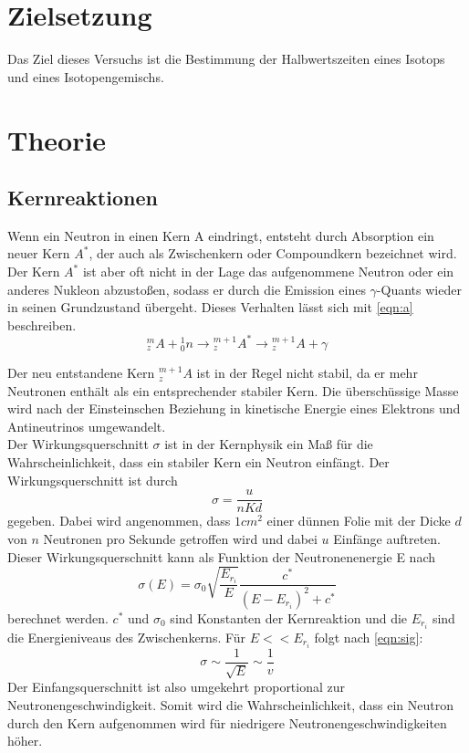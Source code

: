 \section*{Zielsetzung}
\label{sec:zielsetzung}

Das Ziel dieses Versuchs ist die Bestimmung der Halbwertszeiten eines Isotops und eines Isotopengemischs. 

\section{Theorie}
\label{sec:Theorie}


\subsection{Kernreaktionen}
\label{sec:a}
Wenn ein Neutron in einen Kern A eindringt, entsteht durch Absorption ein neuer Kern $A^{*}$, der auch als Zwischenkern oder Compoundkern bezeichnet wird. Der Kern $A^{*}$ ist aber oft nicht in der Lage das aufgenommene Neutron oder ein anderes Nukleon abzustoßen, sodass er durch die Emission eines $\gamma$-Quants wieder in seinen Grundzustand übergeht. Dieses Verhalten lässt sich mit \autoref{eqn:a} beschreiben. 
\begin{equation}
    \label{eqn:a}
    {^{m}_{z}A} + {^{1}_{0}n} \rightarrow {^{m+1}_{z}A^{*}} \rightarrow {^{m+1}_{z}A} + \gamma
\end{equation}


Der neu entstandene Kern ${^{m+1}_{z}A}$ ist in der Regel nicht stabil, da er mehr Neutronen enthält als ein entsprechender stabiler Kern. Die überschüssige Masse wird nach der Einsteinschen Beziehung in kinetische Energie eines Elektrons und Antineutrinos umgewandelt.
\\
Der Wirkungsquerschnitt $\sigma$ ist in der Kernphysik ein Maß für die Wahrscheinlichkeit, dass ein stabiler Kern ein Neutron einfängt. Der Wirkungsquerschnitt ist durch 
\begin{equation}
    \label{eqn:u}
    \sigma = \frac{u}{nKd}
\end{equation}
gegeben. Dabei wird angenommen, dass $1cm^2$ einer dünnen Folie mit der Dicke $d$ von $n$ Neutronen pro Sekunde getroffen wird und dabei $u$ Einfänge auftreten. Dieser Wirkungsquerschnitt kann als Funktion der Neutronenenergie E nach  
\begin{equation}
    \label{eqn:sig}
    \sigma(E) =\sigma_0 \sqrt{\frac{E_{r_i}}{E}} \frac{c^*}{(E-E_{r_i})^2 + c^*}
\end{equation}
berechnet werden. $c^*$ und $\sigma_0$ sind Konstanten der Kernreaktion und die $E_{r_i}$ sind die Energieniveaus des Zwischenkerns. Für $E<<E_{r_i}$ folgt nach \autoref{eqn:sig}:
\begin{equation}
    \label{eqn:prop}
    \sigma \sim \frac{1}{\sqrt{E}} \sim \frac{1}{v}
\end{equation}
Der Einfangsquerschnitt ist also umgekehrt proportional zur Neutronengeschwindigkeit. Somit wird die Wahrscheinlichkeit, dass ein Neutron durch den Kern aufgenommen wird für niedrigere Neutronengeschwindigkeiten höher.


